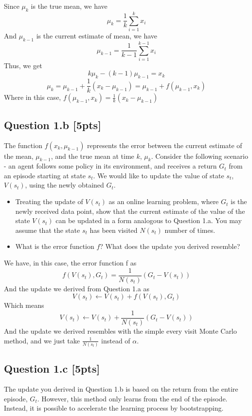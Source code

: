 \documentclass[12pt]{article}
\begin{document}
\noindent
\begin{solution}
Since $\mu_{k}$ is the true mean, we have
$$\mu_{k}=\frac{1}{k}\sum_{i=1}^{k} x_{i}$$
And $\mu_{k-1}$ is the current estimate of mean, we have
$$\mu_{k-1}=\frac{1}{k-1}\sum_{i=1}^{k-1} x_{i}$$
Thus, we get
$$k\mu_{k}-(k-1)\mu_{k-1}=x_{k}$$
$$\mu_{k}=\mu_{k-1}+\frac{1}{k}(x_{k}-\mu_{k-1})=\mu_{k-1} + f(\mu_{k-1}, x_k)$$
Where in this case, $f(\mu_{k-1}, x_k)=\frac{1}{k}(x_{k}-\mu_{k-1})$
\end{solution}

\subsection*{Question 1.b \textbf{[5pts]}}
The function $f(x_k, \mu_{k-1})$ represents the error between the current estimate of the mean, $\mu_{k-1}$, and the true mean at time $k$, $\mu_k$. Consider the following scenario - an agent follows some policy in its environment, and receives a return $G_t$ from an episode starting at state $s_t$. We would like to update the value of state $s_t$, $V(s_t)$, using the newly obtained $G_t$. 

\begin{itemize}
    \item Treating the update of $V(s_t)$ as an online learning problem, where $G_t$ is the newly received data point, show that the current estimate of the value of the state $V(s_t)$ can be updated in a form analogous to Question 1.a. You may assume that the state $s_t$ has been visited $N(s_t)$ number of times.
    
    \item What is the error function $f$? What does the update you derived resemble?  
\end{itemize}

\noindent
\begin{solution}
We have, in this case, the error function f as 
$$f(V(s_{t}), G_t)=\frac{1}{N(s_{t})}(G_{t}-V(s_{t}))$$
And the update we derived from Question 1.a as
$$V(s_{t})\longleftarrow V(s_{t})+f(V(s_{t}), G_t)$$
Which means
$$V(s_{t})\longleftarrow V(s_{t})+\frac{1}{N(s_{t})}(G_{t}-V(s_{t}))$$
And the update we derived resembles with the simple every visit Monte Carlo method, and we just take $\frac{1}{N(s_{t})}$ instead of $\alpha$.
\end{solution}

\subsection*{Question 1.c \textbf{[5pts]}}
The update you derived in Question 1.b is based on the return from the entire episode, $G_t$. However, this method only learns from the end of the episode. Instead, it is possible to accelerate the learning process by bootstrapping. 
\end{document}
